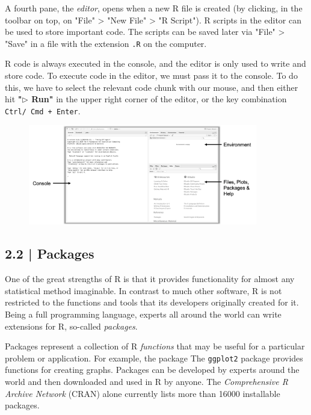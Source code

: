 A fourth pane, the \emph{editor}, opens when a new \textsf{R} file is created (by clicking, in the toolbar on top, on "File" > "New File" > "R Script"). \textsf{R} scripts in the editor can be used to store important code. The scripts can be saved later via "File" > "Save" in a file with the extension \texttt{.R} on the computer.

\textsf{R} code is always executed in the console, and the editor is only used to write and store code. To execute code in the editor, we must pass it to the console. To do this, we have to select the relevant code chunk with our mouse, and then either hit \textbf{"$\triangleright$ Run"} in the upper right corner of the editor, or the key combination \texttt{Ctrl/ Cmd + Enter}.

\begin{figure}[t]
\includegraphics[width=10cm]{images/RStudio_noscript_harrer.png}
\centering
\end{figure}

\subsection{{\normalfont\textsf{\textcolor{sBlue}{\small 2.2 |}}} Packages}

One of the great strengths of \textsf{R} is that it provides functionality for almost any statistical method imaginable. In contrast to much other software, \textsf{R} is not restricted to the functions and tools that its developers originally created for it. Being a full programming language, experts all around the world can write extensions for \textsf{R}, so-called \emph{packages}.

Packages represent a collection of \textsf{R} \emph{functions} that may be useful for a particular problem or application. For example, the package The \texttt{ggplot2} package \citep{ggplot2} provides functions for creating graphs. Packages can be developed by experts around the world and then downloaded and used in \textsf{R} by anyone. The \emph{Comprehensive R Archive Network} (CRAN) alone currently lists more than 16000 installable packages.

